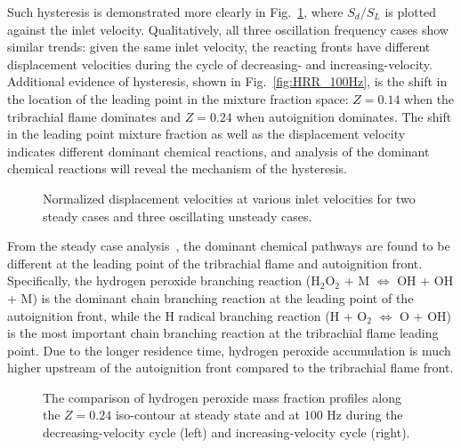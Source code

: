 \documentclass[review,3p,times]{elsarticle}
\begin{document}
Such hysteresis is demonstrated more clearly in Fig.~\ref{fig:sd_hys}, where $S_d/S_L$ is plotted against the inlet velocity.  Qualitatively, all three oscillation frequency cases show similar trends: given the same inlet velocity, the reacting fronts have different displacement velocities during the cycle of decreasing- and increasing-velocity.  Additional evidence of hysteresis, shown in Fig.~\ref{fig:HRR_100Hz}, is the shift in the location of the leading point in the mixture fraction space: $Z = 0.14$ when the tribrachial flame dominates and $Z = 0.24$ when autoignition dominates.  The shift in the leading point mixture fraction as well as the displacement velocity indicates different dominant chemical reactions, and analysis of the dominant chemical reactions will reveal the mechanism of the hysteresis.

\begin{figure}[t]
  \centering
  \scriptsize
  \resizebox{0.5\textwidth}{!}{}
  \normalsize
  \vspace{-0.2in}
  \caption{Normalized displacement velocities at various inlet velocities for two steady cases and three oscillating unsteady cases.}
  \label{fig:sd_hys}
\end{figure}

From the steady case analysis~\cite{deng15b}, the dominant chemical pathways are found to be different at the leading point of the tribrachial flame and autoignition front.  Specifically, the hydrogen peroxide branching reaction (H$_2$O$_2$ + M $\Longleftrightarrow$ OH + OH + M) is the dominant chain branching reaction at the leading point of the autoignition front, while the H radical branching reaction (H + O$_2$ $\Longleftrightarrow$ O + OH) is the most important chain branching reaction at the tribrachial flame leading point.  Due to the longer residence time, hydrogen peroxide accumulation is much higher upstream of the autoignition front compared to the tribrachial flame front.  

\begin{figure}[t]
  \centering
  \scriptsize
  \resizebox{0.49\textwidth}{!}{}
  \resizebox{0.49\textwidth}{!}{}
  \vspace{-0.2in}
  \normalsize
  \caption{The comparison of hydrogen peroxide mass fraction profiles along the $Z = 0.24$ iso-contour at steady state and at $100$ Hz during the decreasing-velocity cycle (left) and increasing-velocity cycle (right).}
  \label{fig:H2O2_updown}
\end{figure}
\end{document}
